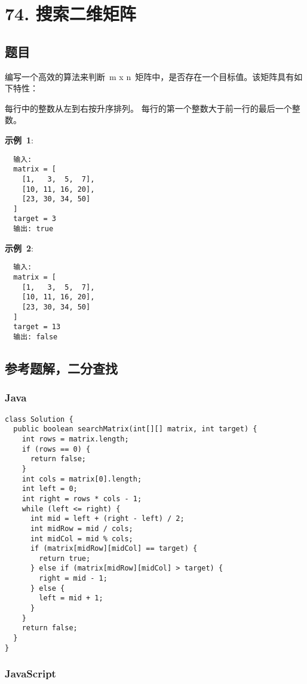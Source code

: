 \newpage
\section{74. 搜索二维矩阵}
\label{leetcode:74}

\subsection{题目}

编写一个高效的算法来判断 m x n 矩阵中，是否存在一个目标值。该矩阵具有如下特性：

每行中的整数从左到右按升序排列。
每行的第一个整数大于前一行的最后一个整数。

\textbf{示例 1}:

\begin{verbatim}
  输入:
  matrix = [
    [1,   3,  5,  7],
    [10, 11, 16, 20],
    [23, 30, 34, 50]
  ]
  target = 3
  输出: true
\end{verbatim}

\textbf{示例 2}:

\begin{verbatim}
  输入:
  matrix = [
    [1,   3,  5,  7],
    [10, 11, 16, 20],
    [23, 30, 34, 50]
  ]
  target = 13
  输出: false
\end{verbatim}

\subsection{参考题解，二分查找}

\subsubsection{Java}

\begin{verbatim}
class Solution {
  public boolean searchMatrix(int[][] matrix, int target) {
    int rows = matrix.length;
    if (rows == 0) {
      return false;
    }
    int cols = matrix[0].length;
    int left = 0;
    int right = rows * cols - 1;
    while (left <= right) {
      int mid = left + (right - left) / 2;
      int midRow = mid / cols;
      int midCol = mid % cols;
      if (matrix[midRow][midCol] == target) {
        return true;
      } else if (matrix[midRow][midCol] > target) {
        right = mid - 1;
      } else {
        left = mid + 1;
      }
    }
    return false;
  }
}
\end{verbatim}

\subsubsection{JavaScript}

